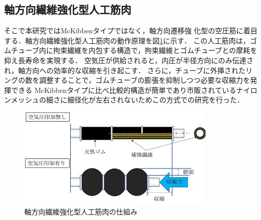 \subsection{軸方向繊維強化型人工筋肉}
そこで本研究ではMcKibbenタイプではなく，軸方向遷移強
化型の空圧筋\cite{}に着目する．軸方向繊維強化型人工筋肉の動作原理を図\ref{fig:siku}に示す．
この人工筋肉は，ゴムチューブ内に拘束繊維を内包する構造で，拘束繊維とゴムチューブとの摩耗を抑え長寿命を実現する．
空気圧が供給されると，内圧が半径方向にのみ伝達され，軸方向への効率的な収縮を引き起こす．
さらに，チューブに外挿されたリングの数を調整することで，ゴムチューブの膨張を抑制しつつ必要な収縮力を発揮できる\cite{3}
McKibbenタイプに比べ比較的構造が簡単であり市販されているナイロンメッシュの細さに細径化が左右されないためこの方式での研究を行った．
\begin{figure}[h]
  \centering  %
  \includegraphics[scale=1]{pic/A.PNG}
  \caption{軸方向繊維強化型人工筋肉の仕組み\cite{4}}
  \label{fig:siku}
\end{figure}


